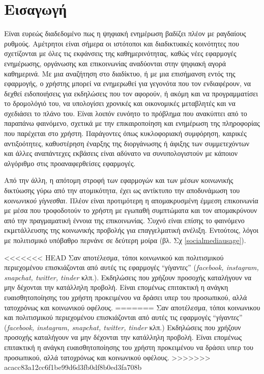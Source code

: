 \chapter{Εισαγωγή}
\label{chap1}

Είναι ευρεώς διαδεδομένο πως η ψηφιακή ενημέρωση βαδίζει πλέον με ραγδαίους ρυθμούς. Αμέτρητοι είναι σήμερα οι ιστότοποι και διαδικτυακές κοινότητες που σχετίζονται με όλες τις εκφάνσεις της καθημερινότητας, καθώς νέες εφαρμογές ενημέρωσης, οργάνωσης και επικοινωνίας αναδύονται στην ψηφιακή αγορά καθημερινά. Με μια αναζήτηση στο διαδίκτυο, ή με μια επισήμανση εντός της εφαρμογής, ο χρήστης μπορεί να ενημερωθεί για γεγονότα που τον ενδιαφέρουν, να δεχθεί ειδοποιήσεις για εκδηλώσεις που τον αφορούν, ή ακόμη και να προγραμματίσει το δρομολόγιό του, να υπολογίσει χρονικές και οικονομικές μεταβλητές και να σχεδιάσει το πλάνο του. Είναι λοιπόν ευνόητο το πρόβλημα που ανακύπτει από το παραπάνω φαινόμενο, σχετικά με την επικαιροποίηση και ενημέρωση της πληροφορίας που παρέχεται στο χρήστη. Παράγοντες όπως κυκλοφοριακή συμφόρηση, καιρικές αντιξοότητες, καθυστέρηση έναρξης της διοργάνωσης ή άφιξης των συμμετεχόντων και άλλες αναπάντεχες εκβάσεις είναι αδύνατο να συνυπολογιστούν με κάποιον αλγόριθμο στις προαναφερθείσες εφαρμογές.

Από την άλλη, η απότομη στροφή των εφαρμογών και των μέσων κοινωνικής δικτύωσης γύρω από την ατομικότητα, έχει ως αντίκτυπο την αποδυνάμωση του \textit{κοινωνικού γίγνεσθαι}. Πλέον είναι προτιμότερη η απομακρυσμένη έμμεση επικοινωνία με μέσα που τροφοδοτούν το χρήστη με εγωπαθή συμπτώματα και τον απομακρύνουν από την πραγμαματική έννοια της επικοινωνίας. Συχνό είναι επίσης το φαινόμενο εκμετάλλευσης της κοινωνικής προβολής για επαγγελματική ανέλιξη. Εντούτοις, λόγοι με πολιτισμικό υπόβαθρο περνάνε σε δεύτερη μοίρα (βλ. Σχ \ref{socialmediausage}). 

<<<<<<< HEAD
Σαν αποτέλεσμα, τόποι κοινωνικού και πολιτισμικού περιεχομένου επισκιάζονται από αυτές τις εφαρμογές ``\textit{γίγαντες}'' (\textit{facebook, instagram, snapchat, twitter, tinder} κλπ.). Εκδηλώσεις που χρήζουν προσοχής καταλήγουν να μην δέχονται την κατάλληλη προβολή. Είναι επομένως επιτακτική η ανάγκη ευαισθητοποίησης του χρήστη προκειμένου να δράσει υπερ του προσωπικού, αλλά τατοχρόνως και κοινωνικού οφέλους.   
=======
Σαν αποτέλεσμα, τόποι κοινωνικου και πολιτισμικού περιεχομένου επισκιάζονται από αυτές τις εφαρμογές ``\textit{γίγαντες}'' (\textit{facebook, instagram, snapchat, twitter, tinder} κλπ.) Εκδηλώσεις που χρήζουν προσοχής καταλήγουν να μην δέχονται την κατάλληλη προβολή. Είναι επομένως επιτακτική η ανάγκη ευαισθητοποίησης του χρήστη προκειμένου να δράσει υπερ του προσωπικού, αλλά τατοχρόνως και κοινωνικού οφέλους.  
>>>>>>> acacc83a12cc6f1be99d6d3fb0df8b0ed3fa708b

